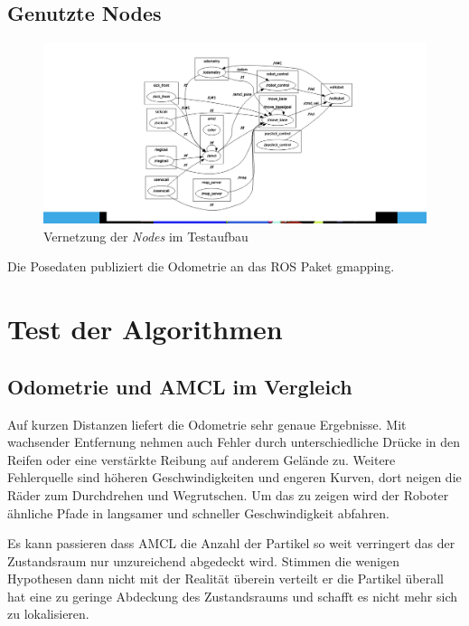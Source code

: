 \documentclass[11pt,a4paper]{article}
\begin{document}
{\subsection{Genutzte Nodes}
{
	
	
	\begin{figure}[h]
		\includegraphics[trim=9cm 1cm 7cm 1cm , clip= true,width=\textwidth]{pictures/node_graph.png}
		\caption{Vernetzung der \textit{Nodes} im Testaufbau}
	\end{figure}
	
	
	
	 Die Posedaten publiziert die Odometrie an das ROS Paket gmapping.	
	
	
} 

\section{Test der Algorithmen} 
\subsection{Odometrie und AMCL im Vergleich}


Auf kurzen Distanzen liefert die Odometrie sehr genaue Ergebnisse. Mit wachsender Entfernung nehmen auch Fehler durch unterschiedliche Dr\"ucke in den Reifen oder eine verst\"arkte Reibung auf anderem Gel\"ande zu. Weitere Fehlerquelle sind h\"oheren Geschwindigkeiten und engeren Kurven, dort neigen die R\"ader zum Durchdrehen und Wegrutschen. Um das zu zeigen wird der Roboter \"ahnliche Pfade in langsamer und schneller Geschwindigkeit abfahren. 	

Es kann passieren dass AMCL die Anzahl der Partikel so weit verringert das der Zustandsraum nur unzureichend abgedeckt wird. Stimmen die wenigen Hypothesen dann nicht mit der Realität überein verteilt er die Partikel überall hat eine zu geringe Abdeckung des Zustandsraums und schafft es nicht mehr sich zu lokalisieren.

}
\end{document}
